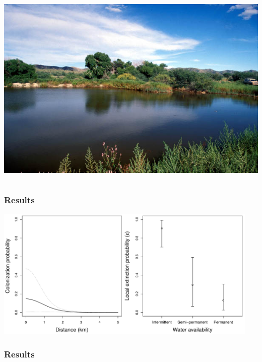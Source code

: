 \documentclass[color=usenames,dvipsnames]{beamer}\usepackage[]{graphicx}\usepackage[]{xcolor}
\begin{document}
\begin{frame}
\begin{columns}
\begin{column}{0.5\textwidth}
      \includegraphics[width=\textwidth]{figs/Carpenter}
    \end{column}
  \end{columns}
\end{frame}




\begin{frame}
  \frametitle{Results}
  \includegraphics[width=0.95\textwidth]{figs/col-ext} \\
\end{frame}



\begin{frame}[fragile]
  \frametitle{Results}
      \centering
         \\
\end{frame}
\end{document}
